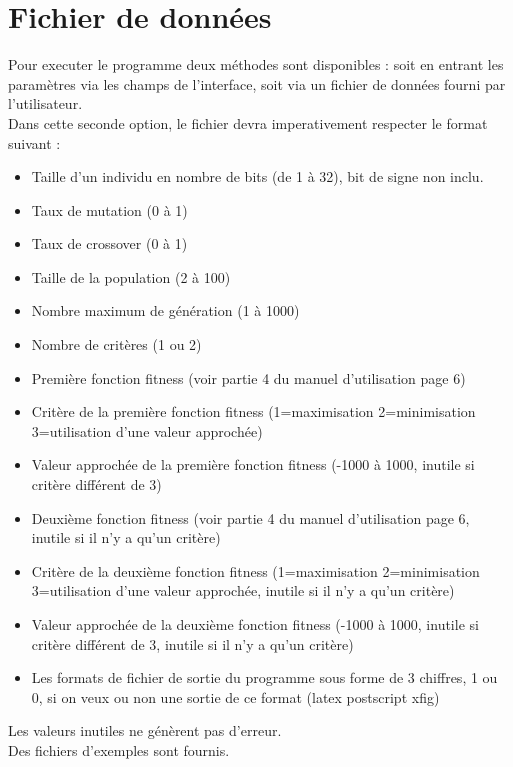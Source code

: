 \documentclass[a4paper,11pt]{article}
\begin{document}
\section{Fichier de données}
Pour executer le programme deux méthodes sont disponibles : soit en entrant les paramètres via les champs de l'interface, soit via un fichier de données fourni par l'utilisateur.\\
Dans cette seconde option, le fichier devra imperativement respecter le format suivant : \\
\begin{itemize}
 \item Taille d'un individu en nombre de bits (de 1 à 32), bit de signe non inclu.
 \item Taux de mutation (0 à 1)
 \item Taux de crossover (0 à 1)
 \item Taille de la population (2 à 100)
 \item Nombre maximum de génération (1 à 1000)
 \item Nombre de critères (1 ou 2)
 \item Première fonction fitness (voir partie 4 du manuel d'utilisation page 6)
 \item Critère de la première fonction fitness (1=maximisation 2=minimisation 3=utilisation d'une valeur approchée)
 \item Valeur approchée de la première fonction fitness (-1000 à 1000, inutile si critère différent de 3)
 \item Deuxième fonction fitness (voir partie 4 du manuel d'utilisation page 6, inutile si il n'y a qu'un critère)
 \item Critère de la deuxième fonction fitness (1=maximisation 2=minimisation 3=utilisation d'une valeur approchée, inutile si il n'y a qu'un critère)
 \item Valeur approchée de la deuxième fonction fitness (-1000 à 1000, inutile si critère différent de 3, inutile si il n'y a qu'un critère)
 \item Les formats de fichier de sortie du programme sous forme de 3 chiffres, 1 ou 0, si on veux ou non une sortie de ce format (latex postscript xfig)
 \end{itemize}
 Les valeurs inutiles ne génèrent pas d'erreur.\\
 Des fichiers d'exemples sont fournis.\\

\newpage
\end{document}
